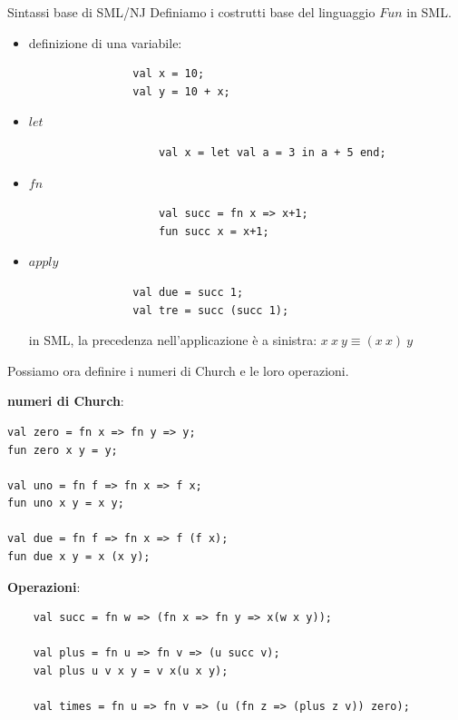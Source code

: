 \documentclass[a4paper,11pt]{report}
\begin{document}
\begin{defframe}{Sintassi base di SML/NJ}{}
    Definiamo i costrutti base del linguaggio \( Fun \) in SML.

    \begin{itemize}
        \item definizione di una variabile:
            \begin{lstlisting}
                val x = 10;
                val y = 10 + x;
            \end{lstlisting}

            \item \( let \)
                \begin{lstlisting}
                    val x = let val a = 3 in a + 5 end;
                \end{lstlisting}

            \item \( fn \)
                \begin{lstlisting}
                    val succ = fn x => x+1;
                    fun succ x = x+1; 
                \end{lstlisting}

            \item \( apply \)
                \begin{lstlisting}
                val due = succ 1;
                val tre = succ (succ 1);
                \end{lstlisting}
                \begin{gframe}{}
                    in SML, la precedenza nell'applicazione è a sinistra:
                    \( x \ x \ y  \equiv (x \ x) \ y \)
                \end{gframe}
    \end{itemize}

\end{defframe}

Possiamo ora definire i numeri di Church e le loro operazioni.

\textbf{numeri di Church}:
\begin{lstlisting}
val zero = fn x => fn y => y;
fun zero x y = y;

val uno = fn f => fn x => f x;
fun uno x y = x y;

val due = fn f => fn x => f (f x);
fun due x y = x (x y);
\end{lstlisting}

\textbf{Operazioni}:
\begin{lstlisting}
    val succ = fn w => (fn x => fn y => x(w x y));

    val plus = fn u => fn v => (u succ v);
    val plus u v x y = v x(u x y);

    val times = fn u => fn v => (u (fn z => (plus z v)) zero);
\end{lstlisting}
\end{document}
